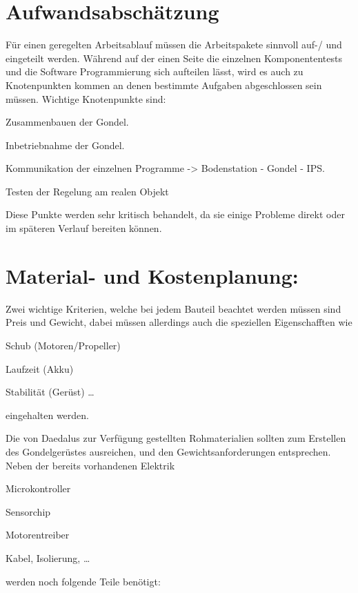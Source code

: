 \documentclass[lang=ngerman,inputenc=utf8,fontsize=10pt]{ldvarticle}
\begin{document}
\section{Aufwandsabschätzung}

Für einen geregelten Arbeitsablauf müssen die Arbeitspakete sinnvoll auf-/ und eingeteilt werden.
Während auf der einen Seite die einzelnen Komponententests und die Software Programmierung sich aufteilen lässt, wird es auch zu Knotenpunkten kommen an denen bestimmte Aufgaben abgeschlossen sein müssen. Wichtige Knotenpunkte sind:
\begin{list}{-}{}

\item Zusammenbauen der Gondel.
\item Inbetriebnahme der Gondel.
\item Kommunikation der einzelnen Programme -> Bodenstation - Gondel - IPS.
\item Testen der Regelung am realen Objekt
\end{list}

Diese Punkte werden sehr kritisch behandelt, da sie einige Probleme direkt oder im späteren Verlauf bereiten können.


\section{Material- und Kostenplanung:}


Zwei wichtige Kriterien, welche bei jedem Bauteil beachtet werden müssen sind Preis und Gewicht, dabei müssen allerdings auch die speziellen Eigenschafften wie
\begin{list}{-}{}
\item Schub (Motoren/Propeller)
\item Laufzeit (Akku)
\item Stabilität (Gerüst)
…
\end{list}
eingehalten werden.

Die von Daedalus zur Verfügung gestellten Rohmaterialien sollten zum Erstellen des Gondelgerüstes ausreichen, und den Gewichtsanforderungen entsprechen. Neben der bereits vorhandenen Elektrik
\begin{list}{-}{}
\item Microkontroller
\item Sensorchip
\item Motorentreiber
\item Kabel, Isolierung, …
\end{list}
werden noch folgende Teile benötigt:
\end{document}
